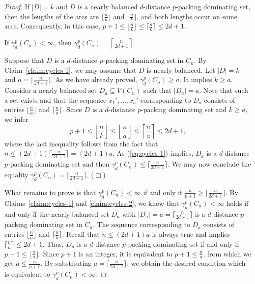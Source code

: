 \documentclass[10pt,a4paper]{amsart}
\newcommand{\smallqed}{{\tiny ($\Box$)}}
\begin{document}
\begin{proof}
If $|D|= k$ and $D$ is a nearly balanced $d$-distance $p$-packing dominating set, then the lengths of the arcs are $\lfloor\frac{n}{k} \rfloor$ and $\lceil\frac{n}{k} \rceil$, and both lengths occur on some arcs. Consequently, in this case, $p+1 \le \lfloor\frac{n}{k} \rfloor \le \lceil\frac{n}{k} \rceil \le 2d+1 $.
\begin{claim} \label{claim:cycles-2}
If $\gamma_d^p(C_n) <\infty$, then $\gamma_d^p(C_n) =  \left\lceil\frac{n}{2d+1}\right\rceil$.    
\end{claim}
\proof Suppose that $D$ is a $d$-distance $p$-packing dominating set in $C_n$. By Claim~\ref{claim:cycles-1}, we may assume that $D$ is nearly balanced. Let $|D|=k$ and $a= \lceil\frac{n}{2d+1}\rceil$. As we have already proved, $\gamma_d^p(C_n) \ge a$. It implies $k \ge a$. Consider a nearly balanced set $D_a \subseteq V(C_n)$ such that $|D_a|=a$. Note that such a set exists and that the sequence $x_1', \dots , x_a'$ corresponding to $D_a$ consists of entries $\lfloor\frac{n}{a} \rfloor$ and $\lceil\frac{n}{a} \rceil$. Since $D$ is a $d$-distance $p$-packing dominating set and $k \ge a$, we infer
\begin{equation} \label{eq:cycles-1}
   \displaystyle p+1 \le \left\lfloor\frac{n}{k} \right\rfloor \le \left\lfloor\frac{n}{a} \right\rfloor \le \left\lceil\frac{n}{a} \right\rceil \le 2d+1, 
\end{equation}
where the last inequality follows from the fact that $n \leq (2d+1) \lceil\frac{n}{2d+1} \rceil = (2d+1)a $. As (\ref{eq:cycles-1}) implies, $D_a$ is a $d$-distance $p$-packing dominating set and then $\gamma_d^p(C_n) \le \lceil\frac{n}{2d+1} \rceil $. We may now conclude the equality $\gamma_d^p(C_n) = \lceil\frac{n}{2d+1} \rceil $. \smallqed
\medskip

What remains to prove is that $\gamma_d^p(C_n) <\infty$ if and only if $\frac{n}{p+1} \ge \lceil\frac{n}{2d+1} \rceil$. By Claims~\ref{claim:cycles-1} and \ref{claim:cycles-2}, we know that $\gamma_d^p(C_n) <\infty$ holds if and only if the nearly balanced set $D_a$ with $|D_a|=a = \lceil\frac{n}{2d+1} \rceil$ is a $d$-distance $p$-packing dominating set in $C_n$. The sequence corresponding to $D_a$ consists of entries $\lfloor\frac{n}{a} \rfloor$ and $\lceil\frac{n}{a} \rceil$. Recall that $n \leq (2d+1)a $ is always true and implies $\lceil\frac{n}{a}\rceil \leq 2d+1$. Thus, $D_a$ is a $d$-distance $p$-packing dominating set if and only if $p+1 \le \lfloor \frac{n}{a}\rfloor$. Since $p+1$ is an integer, it is equivalent to $p+1 \le \frac{n}{a}$, from which we get $a \le \frac{n}{p+1}$. By substituting $a=\lceil \frac{n}{2d+1}\rceil$, we obtain the desired condition which is equivalent to $\gamma_d^p(C_n) < \infty$.    
\end{proof}
\end{document}
